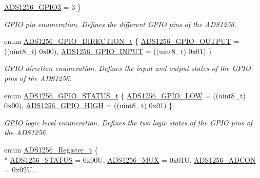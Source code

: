 \begin{DoxyCompactItemize}
\hyperlink{group__ads1256__driver_ggaf55f2ff09e67223f3e5e0a6eb69de98ba4c163c64138d288b3b3d81d82263673b}{A\-D\-S1256\-\_\-\-G\-P\-I\-O3} = 3
 \}
\begin{DoxyCompactList}\small\item\em G\-P\-I\-O pin enumeration. Defines the different G\-P\-I\-O pins of the A\-D\-S1256. \end{DoxyCompactList}\item 
enum \hyperlink{group__ads1256__driver_ga4df06f2662792cc9eff4ac7f97e35026}{A\-D\-S1256\-\_\-\-G\-P\-I\-O\-\_\-\-D\-I\-R\-E\-C\-T\-I\-O\-N\-\_\-t} \{ \hyperlink{group__ads1256__driver_gga4df06f2662792cc9eff4ac7f97e35026aeb27500675e6a6c77bf127853092a6e7}{A\-D\-S1256\-\_\-\-G\-P\-I\-O\-\_\-\-O\-U\-T\-P\-U\-T} = ((uint8\-\_\-t) 0x00), 
\hyperlink{group__ads1256__driver_gga4df06f2662792cc9eff4ac7f97e35026afeaaf398ab13211be0864d1532282e51}{A\-D\-S1256\-\_\-\-G\-P\-I\-O\-\_\-\-I\-N\-P\-U\-T} = ((uint8\-\_\-t) 0x01)
 \}
\begin{DoxyCompactList}\small\item\em G\-P\-I\-O direction enumeration. Defines the input and output states of the G\-P\-I\-O pins of the A\-D\-S1256. \end{DoxyCompactList}\item 
enum \hyperlink{group__ads1256__driver_ga587084017ba4b239ffb8d90376921c2c}{A\-D\-S1256\-\_\-\-G\-P\-I\-O\-\_\-\-S\-T\-A\-T\-U\-S\-\_\-t} \{ \hyperlink{group__ads1256__driver_gga587084017ba4b239ffb8d90376921c2caa73adb23173490c355e1f42cc097b62e}{A\-D\-S1256\-\_\-\-G\-P\-I\-O\-\_\-\-L\-O\-W} = ((uint8\-\_\-t) 0x00), 
\hyperlink{group__ads1256__driver_gga587084017ba4b239ffb8d90376921c2caa47febef361d2bbadc48ef4df1a22f96}{A\-D\-S1256\-\_\-\-G\-P\-I\-O\-\_\-\-H\-I\-G\-H} = ((uint8\-\_\-t) 0x01)
 \}
\begin{DoxyCompactList}\small\item\em G\-P\-I\-O logic level enumeration. Defines the two logic states of the G\-P\-I\-O pins of the A\-D\-S1256. \end{DoxyCompactList}\item 
enum \hyperlink{group__ads1256__driver_ga03b6f97db2c7988af4c239575cc88fde}{A\-D\-S1256\-\_\-\-Register\-\_\-t} \{ \\*
\hyperlink{group__ads1256__driver_gga03b6f97db2c7988af4c239575cc88fdea861808fe9ebfaefd3b40f35d785f76ad}{A\-D\-S1256\-\_\-\-S\-T\-A\-T\-U\-S} = 0x00\-U, 
\hyperlink{group__ads1256__driver_gga03b6f97db2c7988af4c239575cc88fdea2652bd9dbe69551c508a9459a46de864}{A\-D\-S1256\-\_\-\-M\-U\-X} = 0x01\-U, 
\hyperlink{group__ads1256__driver_gga03b6f97db2c7988af4c239575cc88fdea199864dc6828ab191e384581f7de2448}{A\-D\-S1256\-\_\-\-A\-D\-C\-O\-N} = 0x02\-U, 

\end{DoxyCompactItemize}
